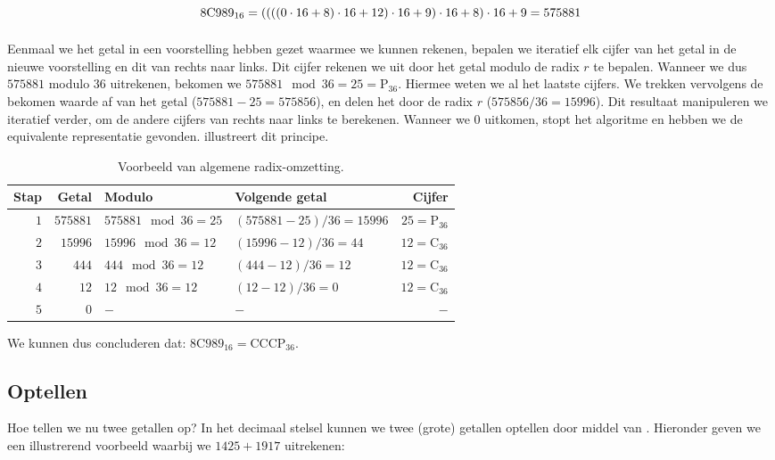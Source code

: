 \begin{equation}
\mbox{8C989}_{16}=\left( \left( \left( \left( 0\cdot 16+8 \right)\cdot 16+12 \right)\cdot 16+9 \right)\cdot 16+8 \right)\cdot 16+9=575881
\end{equation}

\paragraph{}
Eenmaal we het getal in een voorstelling hebben gezet waarmee we kunnen rekenen, bepalen we iteratief elk cijfer van het getal in de nieuwe voorstelling en dit van rechts naar links. Dit cijfer rekenen we uit door het getal modulo de radix $r$ te bepalen. Wanneer we dus $575881$ modulo $36$ uitrekenen, bekomen we $575881\mod36=25=\mbox{P}_{36}$. Hiermee weten we al het laatste cijfers. We trekken vervolgens de bekomen waarde af van het getal ($575881-25=575856$), en delen het door de radix $r$ ($575856/36=15996$). Dit resultaat manipuleren we iteratief verder, om de andere cijfers van rechts naar links te berekenen. Wanneer we $0$ uitkomen, stopt het algoritme en hebben we de equivalente representatie gevonden.  illustreert dit principe.

\begin{table}[hbt]
\centering
\begin{tabular}{r|r|l|l|r}
Stap&Getal&Modulo&Volgende getal&Cijfer\\\hline
$1$&$575881$&$575881\mod36=25$&$\left(575881-25\right)/36=15996$&$25=\mbox{P}_{36}$\\
$2$&$15996$&$15996\mod36=12$&$\left(15996-12\right)/36=44$&$12=\mbox{C}_{36}$\\
$3$&$444$&$444\mod36=12$&$\left(444-12\right)/36=12$&$12=\mbox{C}_{36}$\\
$4$&$12$&$12\mod36=12$&$\left(12-12\right)/36=0$&$12=\mbox{C}_{36}$\\
$5$&$0$&$-$&$-$&$-$
\end{tabular}
\caption{Voorbeeld van algemene radix-omzetting.}
\end{table}

We kunnen dus concluderen dat: $\mbox{8C989}_{16}=\mbox{CCCP}_{36}$.

\subsection{Optellen}

Hoe tellen we nu twee getallen op? In het decimaal stelsel kunnen we twee (grote) getallen optellen door middel van . Hieronder geven we een illustrerend voorbeeld waarbij we $1425+1917$ uitrekenen:

